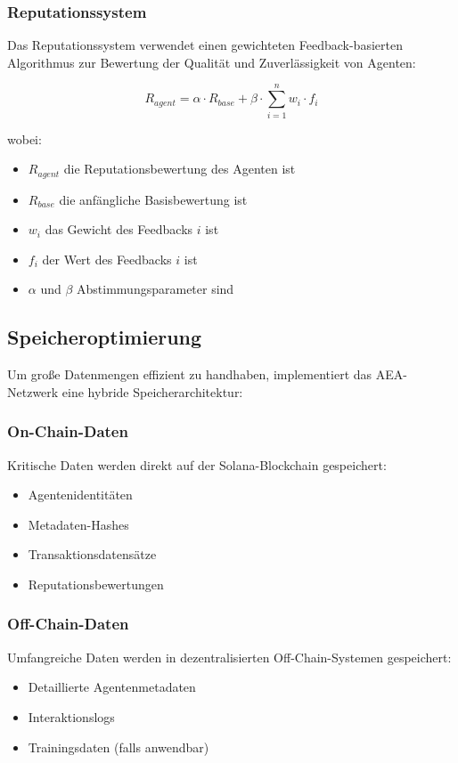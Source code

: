 \documentclass[12pt,a4paper]{article}
\begin{document}
\subsubsection{Reputationssystem}

Das Reputationssystem verwendet einen gewichteten Feedback-basierten Algorithmus zur Bewertung der Qualität und Zuverlässigkeit von Agenten:

\begin{equation}
R_{agent} = \alpha \cdot R_{base} + \beta \cdot \sum_{i=1}^{n} w_i \cdot f_i
\end{equation}

wobei:
\begin{itemize}
\item $R_{agent}$ die Reputationsbewertung des Agenten ist
\item $R_{base}$ die anfängliche Basisbewertung ist
\item $w_i$ das Gewicht des Feedbacks $i$ ist
\item $f_i$ der Wert des Feedbacks $i$ ist
\item $\alpha$ und $\beta$ Abstimmungsparameter sind
\end{itemize}

\subsection{Speicheroptimierung}

Um große Datenmengen effizient zu handhaben, implementiert das AEA-Netzwerk eine hybride Speicherarchitektur:

\subsubsection{On-Chain-Daten}

Kritische Daten werden direkt auf der Solana-Blockchain gespeichert:
\begin{itemize}
\item Agentenidentitäten
\item Metadaten-Hashes
\item Transaktionsdatensätze
\item Reputationsbewertungen
\end{itemize}

\subsubsection{Off-Chain-Daten}

Umfangreiche Daten werden in dezentralisierten Off-Chain-Systemen gespeichert:
\begin{itemize}
\item Detaillierte Agentenmetadaten
\item Interaktionslogs
\item Trainingsdaten (falls anwendbar)
\end{itemize}
\end{document}
